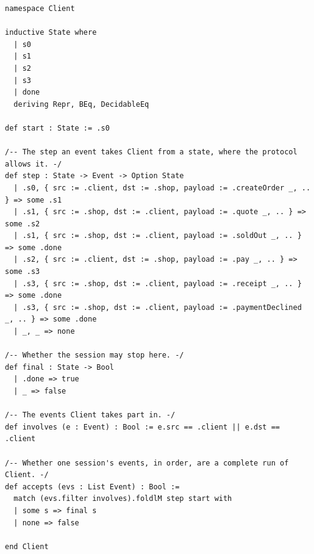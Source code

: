 \begin{lstlisting}[language={},basicstyle=\ttfamily\footnotesize,breaklines=true]
namespace Client

inductive State where
  | s0
  | s1
  | s2
  | s3
  | done
  deriving Repr, BEq, DecidableEq

def start : State := .s0

/-- The step an event takes Client from a state, where the protocol allows it. -/
def step : State -> Event -> Option State
  | .s0, { src := .client, dst := .shop, payload := .createOrder _, .. } => some .s1
  | .s1, { src := .shop, dst := .client, payload := .quote _, .. } => some .s2
  | .s1, { src := .shop, dst := .client, payload := .soldOut _, .. } => some .done
  | .s2, { src := .client, dst := .shop, payload := .pay _, .. } => some .s3
  | .s3, { src := .shop, dst := .client, payload := .receipt _, .. } => some .done
  | .s3, { src := .shop, dst := .client, payload := .paymentDeclined _, .. } => some .done
  | _, _ => none

/-- Whether the session may stop here. -/
def final : State -> Bool
  | .done => true
  | _ => false

/-- The events Client takes part in. -/
def involves (e : Event) : Bool := e.src == .client || e.dst == .client

/-- Whether one session's events, in order, are a complete run of Client. -/
def accepts (evs : List Event) : Bool :=
  match (evs.filter involves).foldlM step start with
  | some s => final s
  | none => false

end Client
\end{lstlisting}
